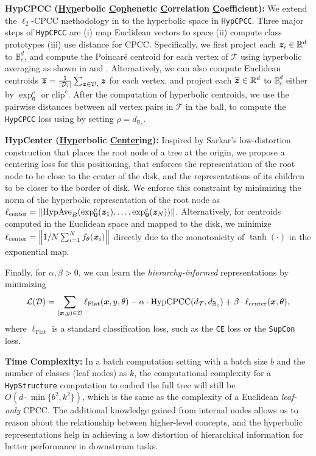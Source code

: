 \textbf{HypCPCC (\underline{Hyp}erbolic \underline{C}o\underline{p}henetic \underline{C}orrelation \underline{C}oefficient):} We extend the $\ell_2$-CPCC methodology in \citet{zeng2022learning} to the hyperbolic space in \texttt{HypCPCC}. Three major steps of \texttt{HypCPCC} are (i) map Euclidean vectors to \Poincare space (ii)  compute class prototypes  (iii) use \Poincare distance for CPCC. Specifically, we first project each ${\bm{z}}_i \in \mathbb{R}^d$ to $\mathbb{B}_c^d$, and compute the Poincaré centroid for each vertex of $\mathcal{T}$ using hyperbolic averaging as shown in  and . Alternatively, we can also compute Euclidean centroids $\overline{{\bm{z}}} = \frac{1}{|{\mathcal{D}}_i|}\sum_{{\bm{z}} \in {\mathcal{D}}_i}{{\bm{z}}}$ for each vertex, and project each $\overline{{\bm{z}}} \in \mathbb{R}^d$ to $\mathbb{B}_c^d$ either by $\exp_{\mathbf{0}}^c$ or $\text{clip}^c$. After the computation of hyperbolic centroids, we use the pairwise distances between all vertex pairs in $\mathcal{T}$ in the \Poincare ball, to compute the \texttt{HypCPCC} loss using  by setting $\rho = d_{\mathbb{B}_c}$. 

\textbf{HypCenter (\underline{Hyp}erbolic \underline{Center}ing):} Inspired by Sarkar's low-distortion construction \citep{Sarkar_2012} that places the root node of a tree at the origin, we propose a centering loss for this positioning, that enforces the representation of the root node to be close to the center of the \Poincare disk, and the representations of its children to be closer to the border of \Poincare disk. We enforce this constraint by minimizing the norm of the hyperbolic representation of the root node as $\ell_\text{center} = \left\lVert\text{HypAve}_B(\exp_{\mathbf{0}}^c({\bm{z}}_1), \dots, \exp_{\mathbf{0}}^c({\bm{z}}_N))\right\rVert$. Alternatively, for centroids computed in the Euclidean space and mapped to the \Poincare disk, we minimize $\ell_\text{center} = \left\lVert1/N\sum_{i=1}^N f_\theta({\bm{x}}_i)\right\rVert$ directly due to the monotonicity of $\tanh(\cdot)$ in the exponential map.

Finally, for $\alpha, \beta > 0$, we can learn the \emph{hierarchy-informed} representations by minimizing
\begin{equation}
    \label{eq:objective_hyp}
    \mathcal{L}({\mathcal{D}}) = \sum_{({\bm{x}}, y)\in {\mathcal{D}}} \ell_\text{Flat}({\bm{x}},y,\theta) - \alpha\cdot\text{HypCPCC}(d_{\mathcal{T}}, d_{\mathbb{B}_c}) + \beta \cdot\ell_\text{center}({\bm{x}}, \theta),
\end{equation}
where $\ell_\text{Flat}$ is a standard classification loss, such as the \texttt{CE} loss or the \texttt{SupCon} loss. 



\textbf{Time Complexity:} In a batch computation setting with a batch size $b$ and the number of classes (leaf nodes) as $k$, the computational complexity for a \texttt{HypStructure} computation to embed the full tree will still be $O(d\cdot\min\{b^2,k^2\})$, which is the same as the complexity of a Euclidean \emph{leaf-only} CPCC. The additional knowledge gained from internal nodes allows us to reason about the relationship between higher-level  concepts, and the hyperbolic representations help in achieving a low distortion of hierarchical information for better performance in downstream tasks.
